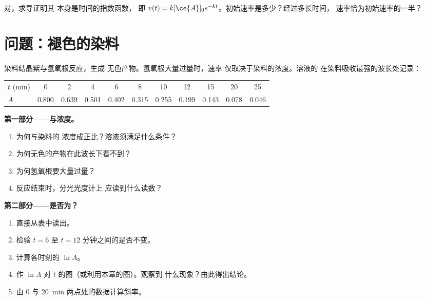 \begin{exercise}[$\star\star\star$]\label{exo:g12:reaction-rates:15}
对，求导证明其
本身是时间的指数函数，
即 $v(t) = k[\ce{A}]_0 e^{-kt}$。初始速率是多少？经过多长时间，
速率恰为初始速率的一半？
\end{exercise}

\section{问题：褪色的染料}

\begin{problem}
\label{pb:g12:reaction-rates:1}
染料结晶紫与氢氧根反应，生成
无色产物。氢氧根大量过量时，速率
仅取决于染料的浓度。溶液的
在染料吸收最强的波长处记录：
\begin{center}
\small
\begin{tabular}{l*{10}{c}}
\hline
$t$ (\si{min}) & 0 & 2 & 4 & 6 & 8 & 10 & 12 & 15 & 20 & 25 \\
$A$ & 0.800 & 0.639 & 0.501 & 0.402 & 0.315 & 0.255 & 0.199 & 0.143 &
0.078 & 0.046 \\
\hline
\end{tabular}
\end{center}

\medskip
\noindent\textbf{第一部分——与浓度。}
\begin{enumerate}
  \item 为何与染料的
        浓度成正比？溶液须满足什么条件？
  \item 为何无色的产物在此波长下看不到？
  \item 为何氢氧根要大量过量？
  \item 反应结束时，分光光度计上
        应读到什么读数？
\end{enumerate}

\medskip
\noindent\textbf{第二部分——是否为？}
\begin{enumerate}[resume]
  \item 直接从表中读出。
  \item 检验 $t = 6$ 至 $t = 12$ 分钟之间的是否不变。
  \item 计算各时刻的 $\ln A$。
  \item 作 $\ln A$ 对 $t$ 的图（或利用本章的图）。观察到
        什么现象？由此得出结论。
  \item 由 0 与 \qty{20}{min} 两点处的数据计算斜率。
\end{enumerate}


\end{problem}
